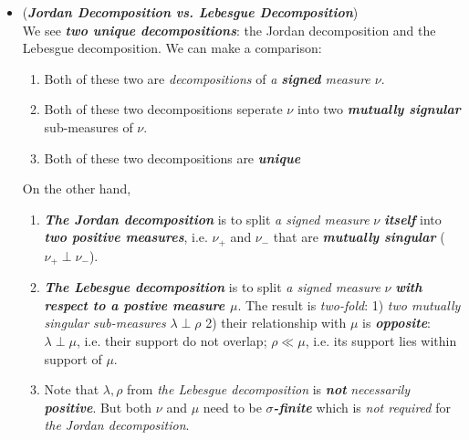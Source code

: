 \documentclass[11pt]{article}
\begin{document}
\begin{itemize}
 \item \begin{remark} (\emph{\textbf{Jordan Decomposition vs. Lebesgue Decomposition}})\\
We see \emph{\textbf{two unique decompositions}}: the Jordan decomposition and the Lebesgue decomposition. We can make a comparison: 
\begin{enumerate}
\item Both of these two are \emph{decompositions} of \emph{a \textbf{signed} measure $\nu$}.
\item Both of these two decompositions seperate $\nu$ into two  \emph{\textbf{mutually signular}} sub-measures of $\nu$.
\item Both of these two decompositions are \emph{\textbf{unique}}
\end{enumerate}
On the other hand,
\begin{enumerate}
\item \emph{\textbf{The Jordan decomposition}} is to split \emph{a signed measure} $\nu$ \emph{\textbf{itself}} into \emph{\textbf{two positive measures}}, i.e. $\nu_{+}$ and $\nu_{-}$ that are \emph{\textbf{mutually singular}} ($\nu_{+} \perp \nu_{-}$). 

\item \emph{\textbf{The Lebesgue decomposition}} is to split \emph{a signed measure} $\nu$ \emph{\textbf{with respect to a postive measure $\mu$}}. The result is \emph{two-fold}: 1) \emph{two mutually singular sub-measures} $\lambda \perp \rho$ 2) their relationship with $\mu$ is \emph{\textbf{opposite}}:  $\lambda \perp \mu$, i.e. their support do not overlap; $\rho \ll \mu$, i.e. its support lies within support of $\mu$.

\item Note that $\lambda, \rho$ from \emph{the Lebesgue decomposition} is \emph{\textbf{not}} \emph{necessarily} \emph{\textbf{positive}}. But both $\nu$ and $\mu$ need to be \emph{\textbf{$\sigma$-finite}} which is \emph{not required} for \emph{the Jordan decomposition}.
\end{enumerate}
\end{remark} 


\end{itemize}
\end{document}
